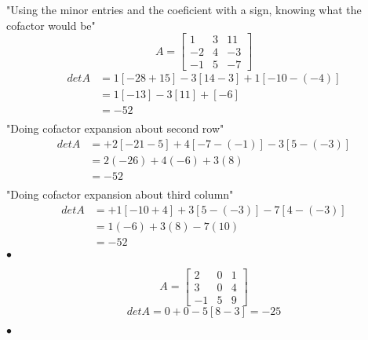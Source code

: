 \begin{example}[3X3 Determinant]
	"Using the minor entries and the coeficient with a sign, knowing what the cofactor would be"
	\[A = \begin{bmatrix}   1 & 3 & 11 \\ -2 & 4 & -3 \\ -1 & 5 & -7\end{bmatrix}\]
	\begin{align*}
		detA &= 1[-28 + 15] -3[14-3] + 1[-10-(-4)] \\
			 &= 1[-13] - 3[11] + [-6] \\
			 &= -52 \\
	\end{align*}
	"Doing cofactor expansion about second row"
	\begin{align*}
		detA &=   +2[-21 -5] + 4[-7-(-1)] -3[5-(-3)]\\
		&= 2(-26) +4(-6) +3(8) \\
		&= -52 \\
	\end{align*}
	"Doing cofactor expansion about third column"
	\begin{align*}
		detA &=   +1[-10 +4] + 3[5-(-3)] -7[4-(-3)]\\
		&= 1(-6) +3(8) -7(10) \\
		&= -52 \\
	\end{align*}
\smallskip\hfill$\bullet$\end{example}

\begin{example}
	\[A = \begin{bmatrix}  2 & 0 & 1 \\ 3 & 0 & 4 \\ -1 & 5 & 9 \end{bmatrix} \]
	\[detA = 0 + 0 -5[8-3] = -25\]

\smallskip\hfill$\bullet$\end{example}





\newpage


